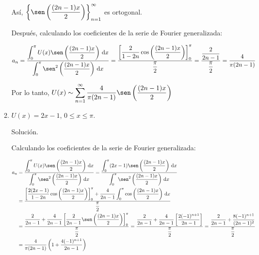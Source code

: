 \documentclass[fleqn]{article}
\newcommand{\integ}[3]{\displaystyle \int_{#1}^{#2} #3 \, \mathrm{d} x}
\begin{document}
\begin{enumerate}[I.]
\begin{enumerate}
            Así, $ \left\lbrace \sen \left( \dfrac{(2n - 1) x}{2} \right) \right\rbrace_{n=1}^{\infty} $ es ortogonal.

            Después, calculando los coeficientes de la serie de Fourier generalizada:

            \begin{align*}
                a_n = \dfrac{\integ{0}{\pi}{U(x) \sen \left( \dfrac{(2n - 1) x}{2} \right)}}{\integ{0}{\pi}{\sen^2 \left( \dfrac{(2n- 1) x}{2} \right)}} 
                = \dfrac{\left[ \dfrac{2}{1 - 2n} \cos \left( \dfrac{(2n - 1) x}{2} \right) \right]_{0}^{\pi}}{\dfrac{\pi}{2}} 
                = \dfrac{\dfrac{2}{2n - 1}}{\dfrac{\pi}{2}} 
                = \dfrac{4}{\pi (2n - 1)}
            \end{align*}

            Por lo tanto, $ U(x) \sim \displaystyle \sum_{n=1}^{\infty} \dfrac{4}{\pi (2n - 1)} \sen \left( \dfrac{(2n - 1) x}{2} \right) $


			\bfseries
			
			\item $ U(x) = 2x - 1 $, $ 0 \leq x \leq \pi $.
			
			Solución.
			
			\normalfont

			Calculando los coeficientes de la serie de Fourier generalizada:

            \begin{align*}
                a_n &= \dfrac{\integ{0}{\pi}{U(x) \sen \left( \dfrac{(2n - 1) x}{2} \right)}}{\integ{0}{\pi}{\sen^2 \left( \dfrac{(2n - 1) x}{2} \right)}} 
				= \dfrac{\integ{0}{\pi}{(2x - 1) \sen \left( \dfrac{(2n - 1) x}{2} \right)}}{\integ{0}{\pi}{\sen^2 \left( \dfrac{(2n - 1) x}{2} \right)}} \\
                &= \dfrac{\left[ \dfrac{2(2x - 1)}{1 - 2n} \cos \left( \dfrac{(2n - 1) x}{2} \right) \right]_{0}^{\pi} + \dfrac{4}{2n - 1} \integ{0}{\pi}{\cos \left( \dfrac{(2n - 1) x}{2} \right)}}{\dfrac{\pi}{2}} \\
                &= \dfrac{\dfrac{2}{2n - 1} + \dfrac{4}{2n - 1} \left[ \dfrac{2}{2n - 1} \sen \left( \dfrac{(2n - 1) x}{2} \right) \right]_{0}^{\pi}}{\dfrac{\pi}{2}} 
                = \dfrac{\dfrac{2}{2n - 1} + \dfrac{4}{2n - 1} \left[ \dfrac{2(-1)^{n+1}}{2n - 1} \right]}{\dfrac{\pi}{2}} 
                = \dfrac{\dfrac{2}{2n - 1} + \dfrac{8(-1)^{n+1}}{(2n - 1)^2}}{\dfrac{\pi}{2}} \\
                &= \dfrac{4}{\pi (2n - 1)} \left( 1 + \dfrac{4(-1)^{n+1}}{2n - 1} \right)
            \end{align*}


\end{enumerate}
\end{enumerate}
\end{document}
